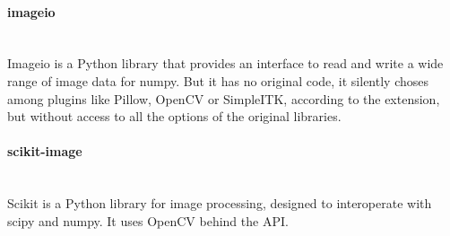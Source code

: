 \paragraph{imageio} \hspace{0pt} \\
Imageio is a Python library that provides an interface to read and write a wide range of image data for numpy. But it has no original code, it silently choses among plugins like Pillow, OpenCV or SimpleITK, according to the extension, but without access to all the options of the original libraries.

\paragraph{scikit-image} \hspace{0pt} \\
Scikit is a Python library for image processing, designed to interoperate with scipy and numpy. It uses OpenCV behind the API.



